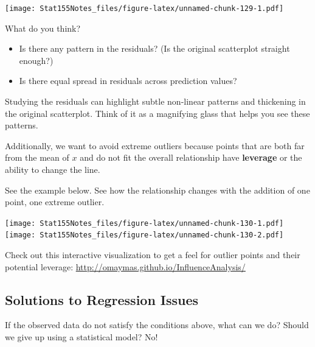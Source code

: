 \documentclass[]{book}
\providecommand{\tightlist}{%
  \setlength{\itemsep}{0pt}\setlength{\parskip}{0pt}}
\begin{document}
\texttt{[image: Stat155Notes\_files/figure-latex/unnamed-chunk-129-1.pdf]}

What do you think?

\begin{itemize}
\tightlist
\item
  Is there any pattern in the residuals? (Is the original scatterplot straight enough?)
\item
  Is there equal spread in residuals across prediction values?
\end{itemize}

Studying the residuals can highlight subtle non-linear patterns and thickening in the original scatterplot. Think of it as a magnifying glass that helps you see these patterns.

Additionally, we want to avoid extreme outliers because points that are both far from the mean of \(x\) and do not fit the overall relationship have \textbf{leverage} or the ability to change the line.

See the example below. See how the relationship changes with the addition of one point, one extreme outlier.

\texttt{[image: Stat155Notes\_files/figure-latex/unnamed-chunk-130-1.pdf]} \texttt{[image: Stat155Notes\_files/figure-latex/unnamed-chunk-130-2.pdf]}

Check out this interactive visualization to get a feel for outlier points and their potential leverage: \url{http://omaymas.github.io/InfluenceAnalysis/}

\hypertarget{solutions-to-regression-issues}{%
\subsection{Solutions to Regression Issues}\label{solutions-to-regression-issues}}

If the observed data do not satisfy the conditions above, what can we do? Should we give up using a statistical model? No!
\end{document}
